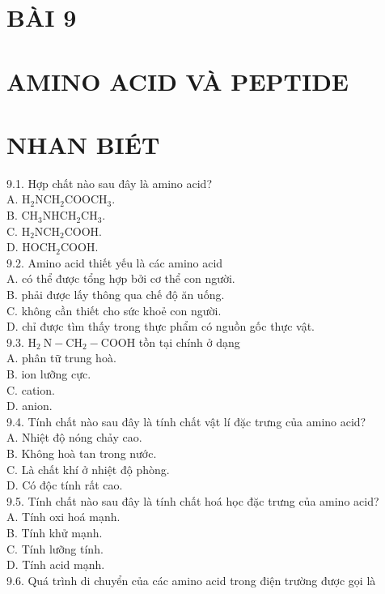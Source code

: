 \documentclass[10pt]{article}
\begin{document}
\section*{BÀI 9}
\section*{AMINO ACID VÀ PEPTIDE}
\section*{NHAN BIÉT}
9.1. Hợp chất nào sau đây là amino acid?\\
A. $\mathrm{H}_{2} \mathrm{NCH}_{2} \mathrm{COOCH}_{3}$.\\
B. $\mathrm{CH}_{3} \mathrm{NHCH}_{2} \mathrm{CH}_{3}$.\\
C. $\mathrm{H}_{2} \mathrm{NCH}_{2} \mathrm{COOH}$.\\
D. $\mathrm{HOCH}_{2} \mathrm{COOH}$.\\
9.2. Amino acid thiết yếu là các amino acid\\
A. có thể được tổng hợp bởi cơ thể con người.\\
B. phải được lấy thông qua chế độ ăn uống.\\
C. không cần thiết cho sức khoẻ con người.\\
D. chỉ được tìm thấy trong thực phẩm có nguồn gốc thực vật.\\
9.3. $\mathrm{H}_{2} \mathrm{~N}-\mathrm{CH}_{2}-\mathrm{COOH}$ tồn tại chính ở dạng\\
A. phân tữ trung hoà.\\
B. ion lưỡng cực.\\
C. cation.\\
D. anion.\\
9.4. Tính chất nào sau đây là tính chất vật lí đặc trưng của amino acid?\\
A. Nhiệt độ nóng chảy cao.\\
B. Không hoà tan trong nước.\\
C. Là chất khí ở nhiệt độ phòng.\\
D. Có độc tính rất cao.\\
9.5. Tính chất nào sau đây là tính chất hoá học đặc trưng của amino acid?\\
A. Tính oxi hoá mạnh.\\
B. Tính khử mạnh.\\
C. Tính lưỡng tính.\\
D. Tính acid mạnh.\\
9.6. Quá trình di chuyển của các amino acid trong điện trường được gọi là\\
\end{document}
